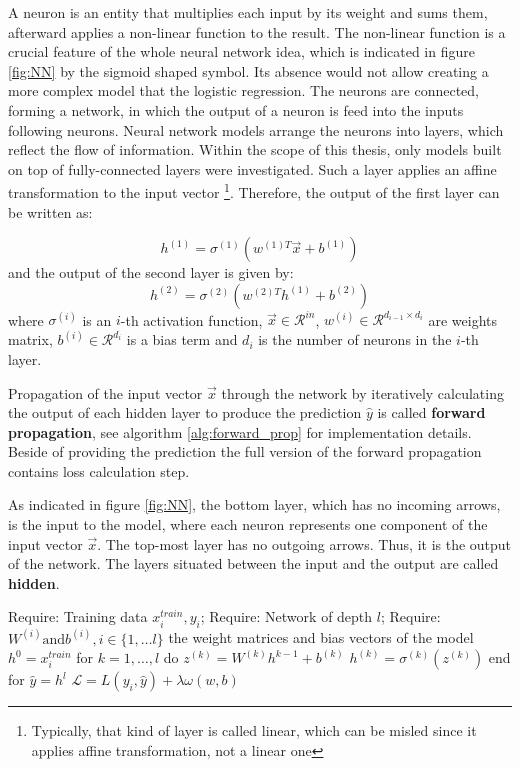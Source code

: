  A neuron is an entity that multiplies each input by its weight and sums them, afterward applies a non-linear function to the result. The non-linear function is a crucial feature of the whole neural network idea, which is indicated in figure \ref{fig:NN} by the sigmoid shaped symbol. Its absence would not allow creating a more complex model that the logistic regression.  The neurons are connected, forming a network, in which the output of a neuron is feed into the inputs following neurons. Neural network models arrange the neurons into layers, which reflect the flow of information. Within the scope of this thesis, only models built on top of fully-connected layers were investigated. Such a layer applies an affine transformation to the input vector \footnote{Typically, that kind of layer is called linear, which can be misled since it applies affine transformation, not a linear one}. Therefore, the output of the first layer can be written as: 

\begin{equation}
h^{(1)} = \sigma^{(1)}(w^{(1)T}\vec{x}+b^{(1)})
\end{equation}
and the output of the  second layer is given by: 
\begin{equation}
h^{(2)} = \sigma^{(2)}(w^{(2)T}h^{(1)}+b^{(2)})
\end{equation}
where $  \sigma^{(i)}$ is an $i$-th activation function, $\vec{x} \in \mathcal{R}^{in}$, $w^{(i)} \in \mathcal{R}^{d_{i-1}\times d_{i}}$ are weights matrix, $b^{(i)} \in \mathcal{R}^{d_{i}}$ is a bias term and $d_{i}$ is the number of neurons in the $i$-th layer.  

Propagation of the input vector $\vec{x}$ through the network by iteratively calculating the output of each hidden layer to produce the prediction $\hat{y}$ is called \textbf{forward propagation}, see algorithm \ref{alg:forward_prop} for implementation details. Beside of providing the prediction  the full version of the forward propagation contains loss calculation step.  

As indicated in figure \ref{fig:NN}, the bottom layer, which has no incoming arrows, is the input to the model, where each neuron represents one component of the input vector $\vec{x}$. 
 The top-most layer has no outgoing arrows. Thus, it is the output of the network.  The layers situated between the input and the output are called \textbf{hidden}. 

\begin{algorithm}[caption={Forward propagation of feed-forward neural network }, label={alg:forward_prop}]
Require: Training data ${x^{train}_{i} , y_{i}}$;
Require: Network of depth $l$;
Require: $W^{(i)} \textrm{and}  b^{(i)}, i \in \{ 1, \ldots l \}$ the weight matrices and bias vectors of the model
$h^{0} =x^{train}_{i}$ 
for $k = 1, \ldots, l$ do
   $z^{(k)} = W^{(k)}h^{k-1} +b^{(k)}$ 
   $h^{(k)} = \sigma^{(k)}(z^{(k)})$
end for
$\hat{y} = h^{l}$
$\mathcal{L} = L(y_{i}, \hat{y}) + \lambda \omega(w, b)$
\end{algorithm}





